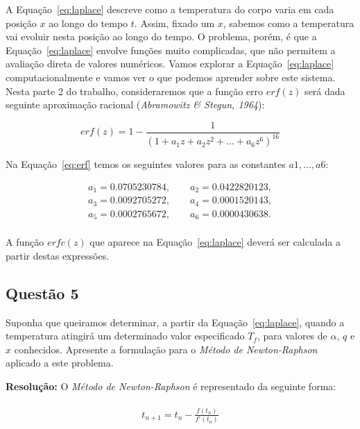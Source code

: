 \documentclass[12pt]{article}
\begin{document}
A Equação~\ref{eq:laplace} descreve como a temperatura do corpo varia em cada posição $x$ ao longo do tempo $t$. Assim, fixado um $x$, sabemos como a temperatura vai evoluir nesta posição ao longo do tempo. O problema, porém, é que a Equação~\ref{eq:laplace} envolve funções muito complicadas, que não permitem a avaliação direta de valores numéricos. Vamos explorar a Equação~\ref{eq:laplace} computacionalmente e vamos ver o que podemos aprender sobre este sistema. Nesta parte 2 do trabalho, consideraremos que a função erro $erf(z)$ será dada seguinte aproximação racional (\textit{Abramowitz \& Stegun, 1964}):

\begin{equation}
erf(z) = 1 - \frac{1}{(1 + a_{1}z + a_{2}z^{2} + ... + a_{6}z^{ 6 })^{16}}
\label{eq:erf}
\end{equation}

Na Equação~\ref{eq:erf} temos os seguintes valores para as constantes $a1, . . . , a6$:

\begin{align*}
a_{1} = 0.0705230784, \qquad a_{2} = 0.0422820123, \\
a_{3} = 0.0092705272, \qquad a_{4} = 0.0001520143, \\
a_{5} = 0.0002765672, \qquad a_{6} = 0.0000430638. \\
\end{align*}

A função $erfc(z)$ que aparece na Equação~\ref{eq:laplace} deverá ser calculada a partir destas expressões.

\subsection*{Questão 5}
\label{sec:p2q5}
Suponha que queiramos determinar, a partir da Equação~\ref{eq:laplace}, quando a temperatura atingirá um determinado valor especificado $T_{f}$, para valores de $\alpha$, $q$ e $x$ conhecidos. Apresente a formulação para o \textit{Método de Newton-Raphson} aplicado a este problema.

\textbf{Resolução:}
O \textit{Método de Newton-Raphson} é representado da seguinte forma:

\begin{eqnarray}
    \begin{split}
        t_{n+1} = t_{n} - \frac{f(t_{n})}{f'(t_{n})}
    \end{split}
    \label{eq:newr}
\end{eqnarray}
\end{document}
